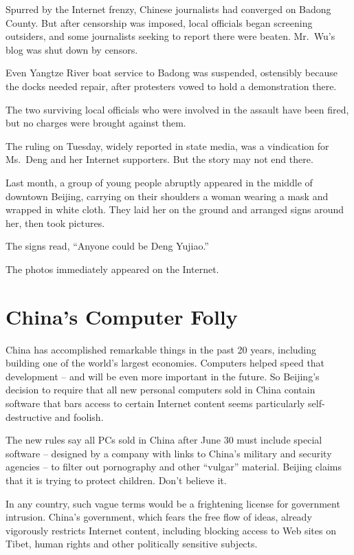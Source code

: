 ﻿\documentclass[12pt,a4paper,onecolumn]{article}
\begin{document}
Spurred by the Internet frenzy, Chinese journalists had converged on Badong County. But after
censorship was imposed, local officials began screening outsiders, and some journalists seeking to
report there were beaten. Mr.~Wu's blog was shut down by censors.

Even Yangtze River boat service to Badong was suspended, ostensibly because the docks needed repair,
after protesters vowed to hold a demonstration there.

The two surviving local officials who were involved in the assault have been fired, but no charges
were brought against them.

The ruling on Tuesday, widely reported in state media, was a vindication for Ms.~Deng and her
Internet supporters. But the story may not end there.

Last month, a group of young people abruptly appeared in the middle of downtown Beijing, carrying on
their shoulders a woman wearing a mask and wrapped in white cloth. They laid her on the ground and
arranged signs around her, then took pictures.

The signs read, ``Anyone could be Deng Yujiao.''

The photos immediately appeared on the Internet.

\section{China's Computer Folly}

China has accomplished remarkable things in the past 20 years, including building one of the world's
largest economies. Computers helped speed that development -- and will be even more important in the
future. So Beijing's decision to require that all new personal computers sold in China contain
software that bars access to certain Internet content seems particularly self-destructive and
foolish.

The new rules say all PCs sold in China after June 30 must include special software -- designed by a
company with links to China's military and security agencies -- to filter out pornography and other
``vulgar'' material. Beijing claims that it is trying to protect children. Don't believe it.

In any country, such vague terms would be a frightening license for government intrusion. China's
government, which fears the free flow of ideas, already vigorously restricts Internet content,
including blocking access to Web sites on Tibet, human rights and other politically sensitive
subjects.
\end{document}
